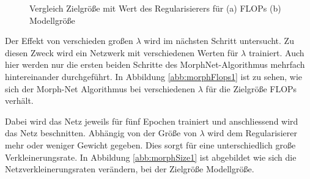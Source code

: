 \begin{figure}
     \centering
     \hfill
     \caption{Vergleich Zielgröße mit Wert des Regularisierers für (a) FLOPs (b) Modellgröße }
     \label{abb:morph1}
\end{figure}

Der Effekt von verschieden großen $\lambda$ wird im nächsten Schritt untersucht. Zu diesen Zweck wird ein Netzwerk mit verschiedenen Werten für $\lambda$ trainiert. Auch hier werden nur die ersten beiden Schritte des MorphNet-Algorithmus mehrfach hintereinander durchgeführt. In Abbildung \ref{abb:morphFlops1} ist zu sehen, wie sich der Morph-Net Algorithmus bei verschiedenen $\lambda$ für die Zielgröße FLOPs verhält. 


Dabei wird das Netz jeweils für fünf Epochen trainiert und anschliessend wird das Netz beschnitten. Abhängig von der Größe von $\lambda$ wird dem Regularisierer mehr oder weniger Gewicht gegeben. Dies sorgt für eine unterschiedlich große Verkleinerungsrate. In Abbildung \ref{abb:morphSize1} ist abgebildet wie sich die Netzverkleinerungsraten verändern, bei der Zielgröße Modellgröße.  

